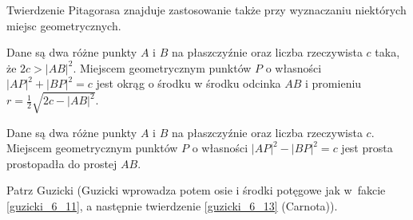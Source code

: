Twierdzenie Pitagorasa znajduje zastosowanie także przy wyznaczaniu niektórych miejsc geometrycznych.

\begin{proposition}
    Dane są dwa różne punkty $A$ i $B$ na płaszczyźnie oraz liczba rzeczywista $c$ taka, że $2c > |AB|^2$.
    Miejscem geometrycznym punktów $P$ o własności $|AP|^2 + |BP|^2 = c$ jest okrąg o środku w środku odcinka $AB$ i promieniu $r = \frac 1 2 \sqrt{2c - |AB|^2}$.
\end{proposition}

\begin{proposition}
    Dane są dwa różne punkty $A$ i $B$ na płaszczyźnie oraz liczba rzeczywista $c$.
    Miejscem geometrycznym punktów $P$ o własności $|AP|^2 - |BP|^2 = c$ jest prosta prostopadła do prostej $AB$.
\end{proposition}

Patrz Guzicki \cite[s. 170-173]{guzicki_2021} (Guzicki wprowadza potem osie i środki potęgowe jak w~fakcie \ref{guzicki_6_11}, a następnie twierdzenie \ref{guzicki_6_13} (Carnota)).


%

